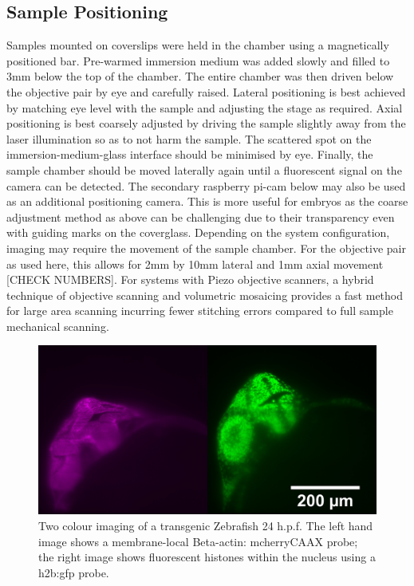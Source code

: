 \subsection{Sample Positioning}
Samples mounted on coverslips were held in the chamber using a magnetically positioned bar.
Pre-warmed immersion medium was added slowly and filled to 3mm below the top of the chamber.
The entire chamber was then driven below the objective pair by eye and carefully raised.
Lateral positioning is best achieved by matching eye level with the sample and adjusting the stage as required.
Axial positioning is best coarsely adjusted by driving the sample slightly away from the laser illumination so as to not harm the sample.
The scattered spot on the immersion-medium-glass interface should be minimised by eye.
Finally, the sample chamber should be moved laterally again until a fluorescent signal on the camera can be detected.
The secondary raspberry pi-cam below may also be used as an additional positioning camera.
This is more useful for embryos as the coarse adjustment method as above can be challenging due to their transparency even with guiding marks on the coverglass.
Depending on the system configuration, imaging may require the movement of the sample chamber.
For the objective pair as used here, this allows for 2mm by 10mm lateral and 1mm axial movement [CHECK NUMBERS].
For systems with Piezo objective scanners, a hybrid technique of objective scanning and volumetric mosaicing provides a fast method for large area scanning incurring fewer stitching errors compared to full sample mechanical scanning.


\begin{figure}
    \centering
    \includegraphics[width=0.8\linewidth]{./fish_image}
    \caption{Two colour imaging of a transgenic Zebrafish 24 h.p.f.
    The left hand image shows a membrane-local  Beta-actin: mcherryCAAX probe;
    the right image shows fluorescent histones within the nucleus using a h2b:gfp probe.}
    \label{}
\end{figure}

